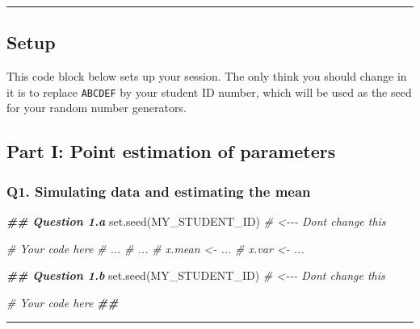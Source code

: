 \documentclass[]{article}
\newenvironment{Shaded}{\begin{snugshade}}{\end{snugshade}}
\newcommand{\CommentTok}[1]{\textcolor[rgb]{0.56,0.35,0.01}{\textit{#1}}}
\newcommand{\DocumentationTok}[1]{\textcolor[rgb]{0.56,0.35,0.01}{\textbf{\textit{#1}}}}
\newcommand{\FunctionTok}[1]{\textcolor[rgb]{0.00,0.00,0.00}{#1}}
\newcommand{\NormalTok}[1]{#1}
\begin{document}
\begin{center}\rule{0.5\linewidth}{0.5pt}\end{center}

\hypertarget{setup}{%
\subsection{Setup}\label{setup}}

This code block below sets up your session. The only think you should
change in it is to replace \texttt{ABCDEF} by your student ID number,
which will be used as the seed for your random number generators.

\hypertarget{part-i-point-estimation-of-parameters}{%
\subsection{Part I: Point estimation of
parameters}\label{part-i-point-estimation-of-parameters}}

\hypertarget{q1.-simulating-data-and-estimating-the-mean}{%
\subsubsection{Q1. Simulating data and estimating the
mean}\label{q1.-simulating-data-and-estimating-the-mean}}

\begin{Shaded}
\begin{Highlighting}[]
\DocumentationTok{\#\# Question 1.a}
\FunctionTok{set.seed}\NormalTok{(MY\_STUDENT\_ID) }\CommentTok{\# \textless{}{-}{-}{-} Don\textquotesingle{}t change this}

\CommentTok{\# Your code here}
\CommentTok{\# ...}
\CommentTok{\# ...}
\CommentTok{\# x.mean \textless{}{-} ...}
\CommentTok{\# x.var  \textless{}{-} ...}
\end{Highlighting}
\end{Shaded}

\begin{Shaded}
\begin{Highlighting}[]
\DocumentationTok{\#\# Question 1.b}
\FunctionTok{set.seed}\NormalTok{(MY\_STUDENT\_ID) }\CommentTok{\# \textless{}{-}{-}{-} Don\textquotesingle{}t change this}

\CommentTok{\# Your code here}
\DocumentationTok{\#\#}
\end{Highlighting}
\end{Shaded}

\begin{center}\rule{0.5\linewidth}{0.5pt}\end{center}
\end{document}

